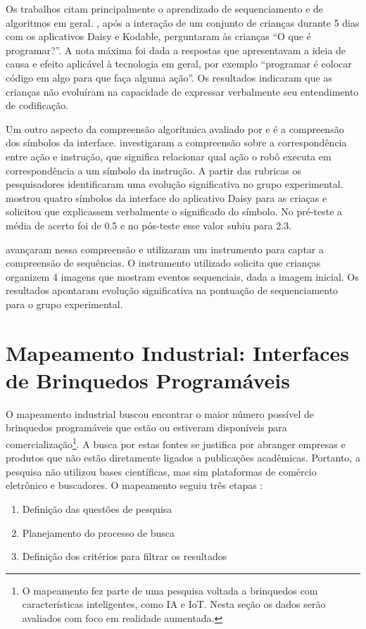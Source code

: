 Os trabalhos citam principalmente o aprendizado de sequenciamento e de algoritmos em geral. , após a interação de um conjunto de crianças durante 5 dias com os aplicativos Daisy e Kodable, perguntaram às crianças “O que é programar?”. A nota máxima foi dada a respostas que apresentavam a ideia de causa e efeito aplicável à tecnologia em geral, por exemplo “programar é colocar código em algo para que faça alguma ação”. Os resultados indicaram que as crianças não evoluíram na capacidade de expressar verbalmente seu entendimento de codificação.

Um outro aspecto da compreensão algorítmica avaliado por  e  é a compreensão dos símbolos da interface.  investigaram a compreensão sobre a correspondência entre ação e instrução, que significa relacionar qual ação o robô executa em correspondência a um símbolo da instrução. A partir das rubricas os pesquisadores identificaram uma evolução significativa no grupo experimental.  mostrou quatro símbolos da interface do aplicativo Daisy para as criaças e solicitou que explicassem verbalmente o significado do símbolo. No pré-teste a média de acerto foi de 0.5 e no pós-teste esse valor subiu para 2.3.

 avançaram nessa compreensão e utilizaram um instrumento para captar a compreensão de sequências. O instrumento utilizado solicita que crianças organizem 4 imagens que mostram eventos sequenciais, dada a imagem inicial. Os resultados apontaram evolução significativa na pontuação de sequenciamento para o grupo experimental.

\section{Mapeamento Industrial: Interfaces de Brinquedos Programáveis}
\label{secao_mapeamento_industrial}

O mapeamento industrial buscou encontrar o maior número possível de brinquedos programáveis que estão ou estiveram disponíveis para comercialização\footnote{O mapeamento fez parte de uma pesquisa voltada a brinquedos com características inteligentes, como IA e IoT. Nesta seção os dados serão avaliados com foco em realidade aumentada.}. A busca por estas fontes se justifica por abranger empresas e produtos que não estão diretamente ligados a publicações acadêmicas. Portanto, a pesquisa não utilizou bases científicas, mas sim plataformas de comércio eletrônico e buscadores. O mapeamento seguiu três etapas \cite{cooper_alice:_2000}:
\begin{enumerate}
    \item Definição das questões de pesquisa
    \item Planejamento do processo de busca
    \item Definição dos critérios para filtrar os resultados
\end{enumerate}

